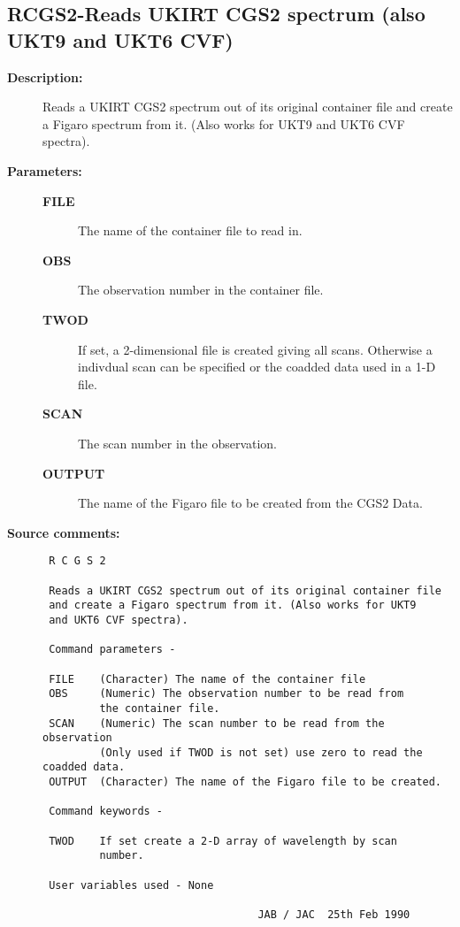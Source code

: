 \subsection{RCGS2-\label{RCGS2}Reads UKIRT CGS2 spectrum (also UKT9 and UKT6 CVF)}
\begin{description}

\item [{\bf Description:}]
 Reads a UKIRT CGS2 spectrum out of its original container
 file and create a Figaro spectrum from it. (Also works for
 UKT9 and UKT6 CVF spectra).

\item [{\bf Parameters:}]
\begin{description}
\item [{\bf FILE}]
 The name of the container file to read in.
\item [{\bf OBS}]
 The observation number in the container file.
\item [{\bf TWOD}]
 If set, a 2-dimensional file is created giving all scans.
 Otherwise a indivdual scan can be specified or the coadded
 data used in a 1-D file.
\item [{\bf SCAN}]
 The scan number in the observation.
\item [{\bf OUTPUT}]
 The name of the Figaro file to be created from the
 CGS2 Data.
\end{description}

\item [{\bf Source comments:}]
\begin{verbatim}
 R C G S 2

 Reads a UKIRT CGS2 spectrum out of its original container file
 and create a Figaro spectrum from it. (Also works for UKT9
 and UKT6 CVF spectra).

 Command parameters -

 FILE    (Character) The name of the container file
 OBS     (Numeric) The observation number to be read from
         the container file.
 SCAN    (Numeric) The scan number to be read from the observation
         (Only used if TWOD is not set) use zero to read the coadded data.
 OUTPUT  (Character) The name of the Figaro file to be created.

 Command keywords -

 TWOD    If set create a 2-D array of wavelength by scan
         number.

 User variables used - None

                                  JAB / JAC  25th Feb 1990
\end{verbatim}
\end{description}
